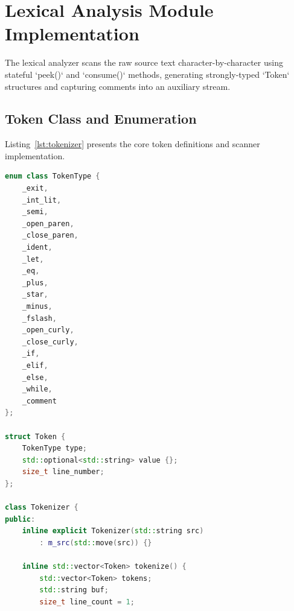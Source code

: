 \section{Lexical Analysis Module Implementation}
The lexical analyzer scans the raw source text character-by-character using stateful `peek()` and `consume()` methods, generating strongly-typed `Token` structures and capturing comments into an auxiliary stream.

\subsection{Token Class and Enumeration}
Listing~\ref{lst:tokenizer} presents the core token definitions and scanner implementation.

\begin{lstlisting}[language=C++, caption={Lexical Analyzer and Tokenizer in C++}, label={lst:tokenizer}]
enum class TokenType {
    _exit,
    _int_lit,
    _semi,
    _open_paren,
    _close_paren,
    _ident,
    _let,
    _eq,
    _plus,
    _star,
    _minus,
    _fslash,
    _open_curly,
    _close_curly,
    _if,
    _elif,
    _else,
    _while,
    _comment
};

struct Token {
    TokenType type;
    std::optional<std::string> value {};
    size_t line_number;
};

class Tokenizer {
public:
    inline explicit Tokenizer(std::string src) 
        : m_src(std::move(src)) {}

    inline std::vector<Token> tokenize() {
        std::vector<Token> tokens;
        std::string buf;
        size_t line_count = 1;


\end{lstlisting}
